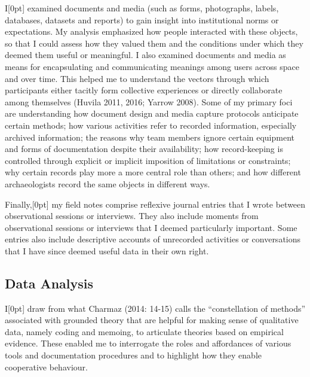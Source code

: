 \documentclass[
]{article}
\newcommand{\paragraphnumber}[1]{\marginnote{\color{lightgray}\tiny{#1}}[0pt]}
\begin{document}
I\paragraphnumber{[35]} examined documents and media (such as forms,
photographs, labels, databases, datasets and reports) to gain insight
into institutional norms or expectations. My analysis emphasized how
people interacted with these objects, so that I could assess how they
valued them and the conditions under which they deemed them useful or
meaningful. I also examined documents and media as means for
encapsulating and communicating meanings among users across space and
over time. This helped me to understand the vectors through which
participants either tacitly form collective experiences or directly
collaborate among themselves (Huvila 2011, 2016; Yarrow 2008). Some of
my primary foci are understanding how document design and media capture
protocols anticipate certain methods; how various activities refer to
recorded information, especially archived information; the reasons why
team members ignore certain equipment and forms of documentation despite
their availability; how record-keeping is controlled through explicit or
implicit imposition of limitations or constraints; why certain records
play more a more central role than others; and how different
archaeologists record the same objects in different ways.

Finally,\paragraphnumber{[36]} my field notes comprise reflexive journal
entries that I wrote between observational sessions or interviews. They
also include moments from observational sessions or interviews that I
deemed particularly important. Some entries also include descriptive
accounts of unrecorded activities or conversations that I have since
deemed useful data in their own right.

\subsection{Data Analysis}\label{data-analysis}

I\paragraphnumber{[37]} draw from what Charmaz (2014: 14-15) calls the
``constellation of methods'' associated with grounded theory that are
helpful for making sense of qualitative data, namely coding and memoing,
to articulate theories based on empirical evidence. These enabled me to
interrogate the roles and affordances of various tools and documentation
procedures and to highlight how they enable cooperative behaviour.
\end{document}
